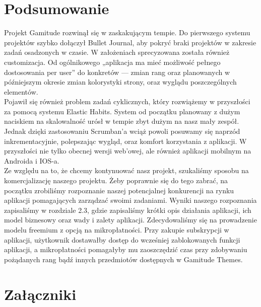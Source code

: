 \documentclass[a4paper,11pt]{report}
\begin{document}
\chapter {Podsumowanie}
Projekt Gamitude rozwinął się w zaskakującym tempie.
Do pierwszego systemu projektów szybko dołączył Bullet Journal, aby pokryć braki projektów w zakresie zadań osadzonych w czasie.
W założeniach sprecyzowana została również customizacja. Od ogólnikowego „aplikacja ma mieć możliwość pełnego dostosowania per user” do konkretów 
— zmian rang oraz planowanych w późniejszym okresie zmian kolorystyki strony, oraz wyglądu poszczególnych elementów.\\
Pojawił się również problem zadań cyklicznych, który rozwiążemy w przyszłości za pomocą systemu Elastic Habits.
System od początku planowany z dużym naciskiem na skalowalność urósł w tempie zbyt dużym na nasz mały zespół.
Jednak dzięki zastosowaniu Scrumban'a wciąż powoli posuwamy się naprzód inkrementacyjnie, polepszając wygląd, oraz komfort korzystania z aplikacji.
W przyszłości nie tylko obecnej wersji web'owej, ale również aplikacji mobilnym na Androida i IOS-a.\\
Ze względu na to, że chcemy kontynuować nasz projekt, szukaliśmy sposobu na komercjalizację naszego projektu.
Żeby poprawnie się do tego zabrać, na początku zrobiliśmy rozpoznanie naszej potencjalnej konkurencji na rynku aplikacji pomagających zarządzać swoimi zadaniami.
Wyniki naszego rozpoznania zapisaliśmy w rozdziale 2.3, gdzie zapisaliśmy krótki opis działania aplikacji, ich model biznesowy oraz wady i zalety aplikacji.
Zdecydowaliśmy się na prowadzenie modelu freemium \cite{freemium} z opcją na mikropłatności. 
Przy zakupie subskrypcji w aplikacji, użytkownik dostawałby dostęp do wcześniej zablokowanych funkcji aplikacji, a mikropłatności pomagałyby mu zaoszczędzić czas przy zdobywaniu pożądanych rang bądź innych przedmiotów dostępnych w Gamitude Themes.

 


\chapter {Załączniki}
\end{document}
